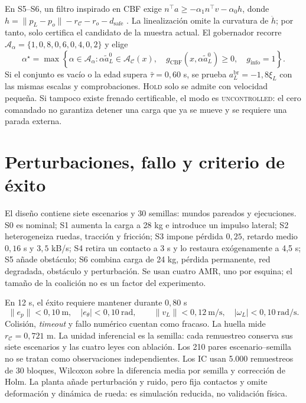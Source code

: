 En S5--S6, un filtro inspirado en CBF exige
$n^\top a\geq-\alpha_1n^\top v-\alpha_0h$, donde
$h=\|p_L-p_o\|-r_{\mathcal C}-r_o-d_{\mathrm{safe}}$
\parencite{ames2017cbf}. La linealización omite la curvatura de $\ddot h$; por
tanto, solo certifica el candidato de la muestra actual. El gobernador recorre
$\mathcal A_\alpha=\{1,0{,}8,0{,}6,0{,}4,0{,}2\}$ y elige
\begin{equation}
\alpha^\star=\max\left\{\alpha\in\mathcal A_\alpha:
\alpha\widetilde a_L^0\in\mathcal A_{\mathcal C}(x),\quad
g_{\mathrm{CBF}}(x,\alpha\widetilde a_L^0)\geq0,\quad
g_{\mathrm{info}}=1\right\}.
\label{eq:n4-governor}
\end{equation}
Si el conjunto es vacío o la edad supera $\bar\tau=0{,}60$ s, se prueba
$a_L^{\mathrm{br}}=-1{,}8\xi_L$ con las mismas escalas y comprobaciones.
\textsc{Hold} solo se admite con velocidad pequeña. Si tampoco existe frenado
certificable, el modo es \textsc{uncontrolled}: el cero comandado no garantiza
detener una carga que ya se mueve y se requiere una parada externa.

\section*{Perturbaciones, fallo y criterio de éxito}

El diseño contiene siete escenarios y 30 semillas: \SPTwoReadyWorlds{} mundos
pareados y \SPTwoReadyDynamicRuns{} ejecuciones. S0 es nominal; S1 aumenta la
carga a 28 kg e introduce un impulso lateral; S2 heterogeneiza ruedas, tracción
y fricción; S3 impone pérdida $0{,}25$, retardo medio $0{,}16$ s y
$3{,}5$ kB/s; S4 retira un contacto a 3 s y lo restaura exógenamente a 4,5 s;
S5 añade obstáculo; S6 combina carga de 24 kg, pérdida permanente, red
degradada, obstáculo y perturbación. Se usan cuatro AMR, uno por esquina; el
tamaño de la coalición no es un factor del experimento.

En 12 s, el éxito requiere mantener durante $0{,}80$ s
\[
\|e_p\|<0{,}10\ \mathrm m,\quad |e_\theta|<0{,}10\ \mathrm{rad},\qquad
\|v_L\|<0{,}12\ \mathrm{m/s},\quad |\omega_L|<0{,}10\ \mathrm{rad/s}.
\]
Colisión, \emph{timeout} y
fallo numérico cuentan como fracaso. La huella mide
$r_{\mathcal C}=0{,}721$ m. La unidad inferencial es la semilla: cada remuestreo
conserva sus siete escenarios y las cuatro leyes con ablación. Los 210 pares
escenario--semilla no se tratan como observaciones independientes. Los IC usan
5.000 remuestreos de 30 bloques, Wilcoxon sobre la diferencia media por semilla
y corrección de Holm. La planta añade perturbación y ruido, pero fija contactos
y omite deformación y dinámica de rueda: es simulación reducida, no validación
física.

